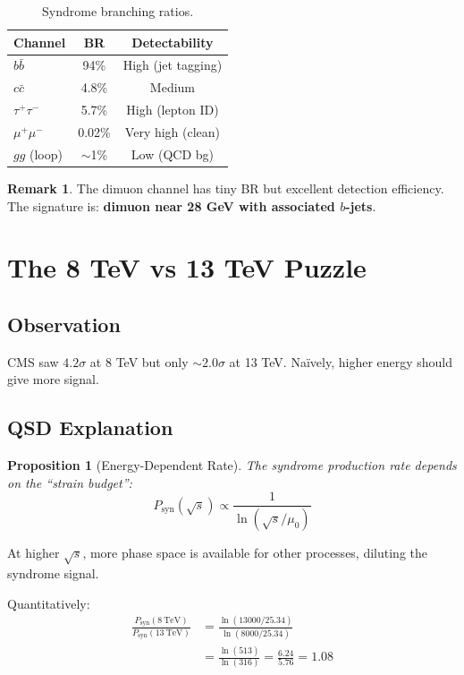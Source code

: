 \documentclass[11pt,a4paper]{article}
\newtheorem{proposition}[theorem]{Proposition}
\theoremstyle{definition}
\newtheorem{remark}[theorem]{Remark}
\newcommand{\murad}{\mu_0}
\newcommand{\Psyn}{P_{\text{syn}}}
\begin{document}
\begin{table}[h]
\centering
\begin{tabular}{lcc}
\toprule
\textbf{Channel} & \textbf{BR} & \textbf{Detectability} \\
\midrule
$b\bar{b}$ & 94\% & High (jet tagging) \\
$c\bar{c}$ & 4.8\% & Medium \\
$\tau^+\tau^-$ & 5.7\% & High (lepton ID) \\
$\mu^+\mu^-$ & 0.02\% & Very high (clean) \\
$gg$ (loop) & $\sim$1\% & Low (QCD bg) \\
\bottomrule
\end{tabular}
\caption{Syndrome branching ratios.}
\end{table}

\begin{remark}
The dimuon channel has tiny BR but excellent detection efficiency. The signature is: \textbf{dimuon near 28 GeV with associated $b$-jets}.
\end{remark}

\section{The 8 TeV vs 13 TeV Puzzle}

\subsection{Observation}

CMS saw $4.2\sigma$ at 8 TeV but only $\sim 2.0\sigma$ at 13 TeV. Na\"ively, higher energy should give more signal.

\subsection{QSD Explanation}

\begin{proposition}[Energy-Dependent Rate]
The syndrome production rate depends on the ``strain budget'':
\begin{equation}
\Psyn(\sqrt{s}) \propto \frac{1}{\ln(\sqrt{s}/\murad)}
\end{equation}
\end{proposition}

At higher $\sqrt{s}$, more phase space is available for other processes, diluting the syndrome signal.

Quantitatively:
\begin{align}
\frac{\Psyn(8~\text{TeV})}{\Psyn(13~\text{TeV})} &= \frac{\ln(13000/25.34)}{\ln(8000/25.34)} \\
&= \frac{\ln(513)}{\ln(316)} = \frac{6.24}{5.76} = 1.08
\end{align}
\end{document}
